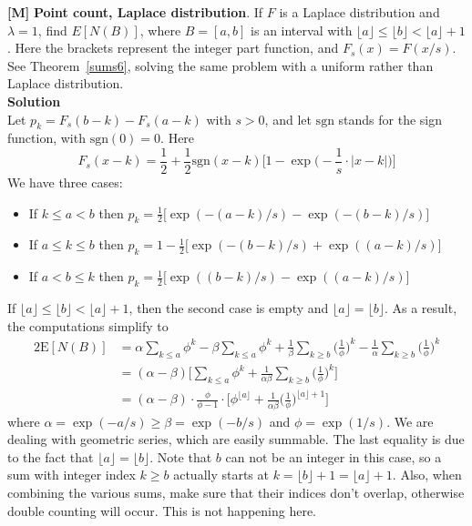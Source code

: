 \documentclass[10pt]{article}
\begin{document}
\begin{Exercise}\label{exercise1}
{\bf [M]} {\bf Point count, Laplace distribution}. If $F$ is a \textcolor{index}{Laplace distribution}  and $\lambda=1$, find $E[N(B)]$, where $B=[a,b]$ is an interval with $\lfloor a \rfloor \leq \lfloor b \rfloor < \lfloor a \rfloor +1$. Here the brackets represent the integer part function, and $F_s(x)=F(x/s)$. See Theorem~\ref{sums6}, solving the same problem with a uniform rather than Laplace distribution. \vspace{1ex}   \\
{\bf Solution} \vspace{1ex}   \\
Let  $p_k=F_s(b-k)-F_s(a-k)$ with $s>0$, and let  $\mbox{sgn}$ stands for the sign function, with $\mbox{sgn}(0)=0$. Here
$$F_s(x-k)=\frac{1}{2}+\frac{1}{2}\mbox{sgn}(x-k)\Big[1-\exp\Big(-\frac{1}{s}\cdot|x-k|\Big)\Big] $$
We have three cases:
\begin{itemize}
 \item If $k\leq a < b$ then $p_k=\frac{1}{2}\Big[\exp(-(a-k)/s) - \exp(-(b-k)/s)\Big] $
 \item If $a\leq k \leq b$ then $p_k=1-\frac{1}{2}\Big[\exp(-(b-k)/s) +   \exp((a-k)/s)\Big] $
 \item If $a< b\leq k$ then $p_k=\frac{1}{2}\Big[\exp((b-k)/s) -   \exp((a-k)/s)\Big] $
\end{itemize}
If $\lfloor a \rfloor \leq \lfloor b \rfloor < \lfloor a \rfloor +1$, then the second case is empty and
$\lfloor a\rfloor = \lfloor b\rfloor$. As a result, the computations simplify to
\begin{align}
2\mbox{E}[N(B)]& =\alpha\sum_{k\leq a}\phi^k -\beta\sum_{k\leq a}\phi^k
+ \frac{1}{\beta}\sum_{k\geq b} \Big(\frac{1}{\phi}\Big)^k- \frac{1}{\alpha}\sum_{k\geq b}\Big(\frac{1}{\phi}\Big)^k \nonumber \\
 & = (\alpha-\beta)\Big[\sum_{k\leq a}\phi^k  +  \frac{1}{\alpha\beta}   \sum_{k\geq b}\Big(\frac{1}{\phi}\Big)^k  \Big] \nonumber \\
 & =(\alpha-\beta)\cdot\frac{\phi}{\phi-1}\cdot\Big[  \phi^{\lfloor a \rfloor} +\frac{1}{\alpha\beta}\Big(\frac{1}{\phi}\Big)^{\lfloor a\rfloor+1} \Big ] \nonumber
\end{align}
where $\alpha= \exp(-a/s)\geq \beta= \exp(-b/s)$ and $\phi=\exp(1/s)$. We are dealing with geometric series, which are easily summable. The last equality is due to the fact that  $\lfloor a\rfloor = \lfloor b \rfloor$. Note that $b$ can not be an integer in this case, so a sum with integer index $k\geq b$ actually starts at $k=\lfloor b \rfloor +1 = \lfloor a \rfloor + 1$.
Also, when combining the various sums, make sure that their indices don't overlap, otherwise double counting will occur. This is not happening here.
\end{Exercise}
\end{document}
